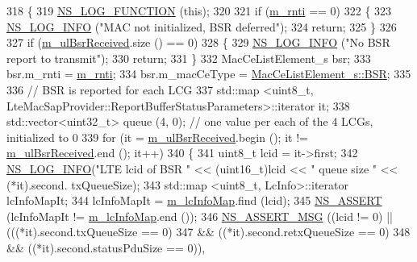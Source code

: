 \begin{DoxyCode}
318 \{
319   \hyperlink{log-macros-disabled_8h_a90b90d5bad1f39cb1b64923ea94c0761}{NS\_LOG\_FUNCTION} (\textcolor{keyword}{this});
320 
321   \textcolor{keywordflow}{if} (\hyperlink{classns3_1_1LteUeMac_a95e386ad717fad6e09de8c139fe0ca89}{m\_rnti} == 0)
322     \{
323       \hyperlink{group__logging_gafbd73ee2cf9f26b319f49086d8e860fb}{NS\_LOG\_INFO} (\textcolor{stringliteral}{"MAC not initialized, BSR deferred"});
324       \textcolor{keywordflow}{return}; 
325     \}
326 
327   \textcolor{keywordflow}{if} (\hyperlink{classns3_1_1LteUeMac_ab1de37ecba7b76c9de1dd81bf49ac66d}{m\_ulBsrReceived}.size () == 0)
328     \{
329       \hyperlink{group__logging_gafbd73ee2cf9f26b319f49086d8e860fb}{NS\_LOG\_INFO} (\textcolor{stringliteral}{"No BSR report to transmit"});
330       \textcolor{keywordflow}{return}; 
331     \}
332   MacCeListElement\_s bsr;
333   bsr.m\_rnti = \hyperlink{classns3_1_1LteUeMac_a95e386ad717fad6e09de8c139fe0ca89}{m\_rnti};
334   bsr.m\_macCeType = \hyperlink{structns3_1_1MacCeListElement__s_a270a6526dfc7da02e9dc91823c290f6bac50796b01160b1825ec34efa1ad9f051}{MacCeListElement\_s::BSR};
335 
336   \textcolor{comment}{// BSR is reported for each LCG}
337   std::map <uint8\_t, LteMacSapProvider::ReportBufferStatusParameters>::iterator it;  
338   std::vector<uint32\_t> queue (4, 0); \textcolor{comment}{// one value per each of the 4 LCGs, initialized to 0}
339   \textcolor{keywordflow}{for} (it = \hyperlink{classns3_1_1LteUeMac_ab1de37ecba7b76c9de1dd81bf49ac66d}{m\_ulBsrReceived}.begin (); it != \hyperlink{classns3_1_1LteUeMac_ab1de37ecba7b76c9de1dd81bf49ac66d}{m\_ulBsrReceived}.end (); it++)
340     \{
341       uint8\_t lcid = it->first;
342       \hyperlink{group__logging_gafbd73ee2cf9f26b319f49086d8e860fb}{NS\_LOG\_INFO}(\textcolor{stringliteral}{"LTE lcid of BSR "} << (uint16\_t)lcid << \textcolor{stringliteral}{" queue size "} << (*it).second.
      txQueueSize);
343       std::map <uint8\_t, LcInfo>::iterator lcInfoMapIt;
344       lcInfoMapIt = \hyperlink{classns3_1_1LteUeMac_af4d5b382d725f5e2fbf18dcdb60401ed}{m\_lcInfoMap}.find (lcid);
345       \hyperlink{assert_8h_a6dccdb0de9b252f60088ce281c49d052}{NS\_ASSERT} (lcInfoMapIt !=  \hyperlink{classns3_1_1LteUeMac_af4d5b382d725f5e2fbf18dcdb60401ed}{m\_lcInfoMap}.end ());
346       \hyperlink{assert_8h_aff5ece9066c74e681e74999856f08539}{NS\_ASSERT\_MSG} ((lcid != 0) || (((*it).second.txQueueSize == 0)
347                                      && ((*it).second.retxQueueSize == 0)
348                                      && ((*it).second.statusPduSize == 0)),

\end{DoxyCode}
